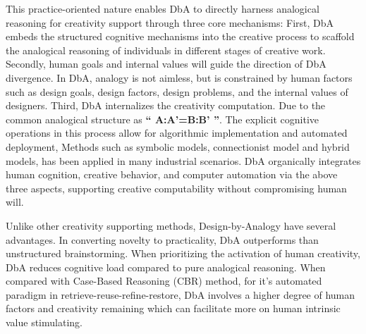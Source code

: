 This practice-oriented nature enables DbA to directly harness analogical reasoning\cite{gentner1983structure, gentner2011computational, linsey2008increasing} for creativity support through three core mechanisms: First, DbA embeds the structured cognitive mechanisms\cite{french2002computational} into the creative process to scaffold the analogical reasoning of individuals in different stages of creative work\cite{hsueh2024counts}. Secondly, human goals and internal values will guide the direction of DbA divergence. In DbA, analogy is not aimless, but is constrained by human factors such as design goals, design factors, design problems, and the internal values of designers\cite{moreno2015step, chan2011benefits}.
Third, DbA internalizes the creativity computation. Due to the common analogical structure as \textbf{`` A:A'=B:B' ''}\cite{gentner1983structure}. The explicit cognitive operations in this process allow for algorithmic implementation and automated deployment, Methods such as symbolic models\cite{falkenhainer1989structure}, connectionist model\cite{thagard1990analog, hummel1997distributed} and hybrid models\cite{hofstadter1984copycat}, has been applied in many industrial scenarios. DbA organically integrates human cognition, creative behavior, and computer automation via the above three aspects, supporting creative computability without compromising human will.


Unlike other creativity supporting methods, Design-by-Analogy have several advantages. In converting novelty to practicality, DbA outperforms than unstructured brainstorming\cite{linsey2010study}. When prioritizing the activation of human creativity, DbA reduces cognitive load compared to pure analogical reasoning\cite{richland2013reducing}. When compared with Case-Based Reasoning (CBR) method, for it's automated paradigm in retrieve-reuse-refine-restore, DbA involves a higher degree of human factors and creativity remaining\cite{wills1994towards} which can facilitate more on human intrinsic value stimulating.

